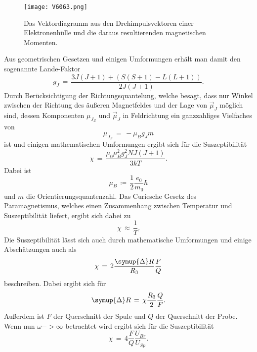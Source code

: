 \documentclass[
  bibliography=totoc,     %
  captions=tableheading,  %
  titlepage=firstiscover, %
]{scrartcl}
\begin{document}
\begin{figure}[H]
  \centering
  \texttt{[image: V6063.png]}
  \caption{Das Vektordiagramm aus den Drehimpulsvektoren einer Elektronenhülle
  und die daraus resultierenden magnetischen Momenten. \cite{anleitung}}
  \label{fig:V6061}
\end{figure}
\noindent
Aus geometrischen Gesetzen und einigen Umformungen erhält man damit den sogenannte Lande-Faktor
\begin{equation}
  g_J\,=\, \frac{3J(J+1)+ (S(S+1)-L(L+1))}{2J(J+1)}.
  \label{eqn:g_j}
\end{equation}
Durch Berücksichtigung der Richtungsquantelung, welche besagt, dass nur Winkel
zwischen der Richtung des äußeren Magnetfeldes und der Lage von $\vec{\mu}_J$
möglich sind, dessen Komponenten $\mu_{J_Z}$ und $\vec{\mu}_J$ in Feldrichtung
ein ganzzahliges Vielfaches von
\begin{equation}
  \mu_{J_Z} \,=\,- \mu_B g_J m
  \label{eqn:mu}
\end{equation}
ist und einigen mathematischen Umformungen ergibt sich für die Suszeptibilität
\begin{equation}
  \chi \,=\, \frac{\mu_0 \mu_B^2 g_J^2 NJ(J+1)}{3kT}.
  \label{eqn:xi}
\end{equation}
Dabei ist
\begin{equation*}
  \mu_B\,\coloneq\,\frac{1}{2} \frac{e_0}{m_0} \hbar
\end{equation*}
und $m$ die Orientierungsquantenzahl.
Das Curiesche Gesetz des Paramagnetismus, welches einen Zusammenhang zwischen
Temperatur und Suszeptibilität liefert, ergibt sich dabei zu
\begin{equation}
  \chi\,\approx\,\frac{1}{T}.
\end{equation}
Die Suszeptibilität lässt sich auch durch mathematische Umformungen und einige
Abschätzungen auch als
\begin{equation}
  \chi\,=\,2\frac{\symup{\Delta}R}{R_3} \frac{F}{Q}
  \label{eqn:xi2}
\end{equation}
beschreiben. Dabei ergibt sich für
\begin{equation*}
  \symup{\Delta}R\,=\,\chi \frac{R_3}{2} \frac{Q}{F}.
\end{equation*}
Außerdem ist $F$ der Querschnitt der Spule und $Q$ der Querschnitt der Probe.
Wenn nun $\omega -> \infty$ betrachtet wird  ergibt sich für die Suszeptibilität
\begin{equation}
  \chi\,=\,4 \frac{F}{Q} \frac{U_{Br}}{U_{Sp}}.
  \label{eqn:infty}
\end{equation}
\end{document}
